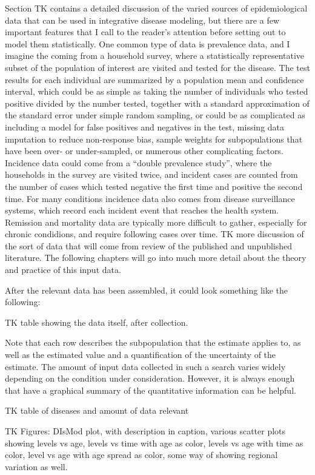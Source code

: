 Section TK contains a detailed discussion of the varied sources of
epidemiological data that can be used in integrative disease modeling,
but there are a few important features that I call to the reader's
attention before setting out to model them statistically. One common
type of data is prevalence data, and I imagine the coming from a
household survey, where a statistically representative subset of the
population of interest are visited and tested for the disease. The
test results for each individual are summarized by a population mean
and confidence interval, which could be as simple as taking the number
of individuals who tested positive divided by the number tested,
together with a standard approximation of the standard error under
simple random sampling, or could be as complicated as including a
model for false positives and negatives in the test, missing data
imputation to reduce non-response bias, sample weights for
subpopulations that have been over- or under-sampled, or numerous
other complicating factors. Incidence data could come from a ``double
prevalence study'', where the households in the survey are visited
twice, and incident cases are counted from the number of cases which
tested negative the first time and positive the second time. For many
conditions incidence data also comes from disease surveillance
systems, which record each incident event that reaches the health
system.  Remission and mortality data are typically more difficult to
gather, especially for chronic condidions, and require following cases
over time. TK more discussion of the sort of data that will come from
review of the published and unpublished literature. The following
chapters will go into much more detail about the theory and practice
of this input data.


After the relevant data has been assembled, it could look something
like the following:

TK table showing the data itself, after collection.

Note that each row describes the subpopulation that the estimate
applies to, as well as the estimated value and a quantification of the
uncertainty of the estimate. The amount of input data collected in
such a search varies widely depending on the condition under
consideration. However, it is always enough that have a graphical
summary of the quantitative information can be helpful.

TK table of diseases and amount of data relevant

TK Figures: DIsMod plot, with description in caption, various scatter
plots showing levels vs age, levels vs time with age as color, levels
vs age with time as color, level vs age with age spread as color, some
way of showing regional variation as well.


